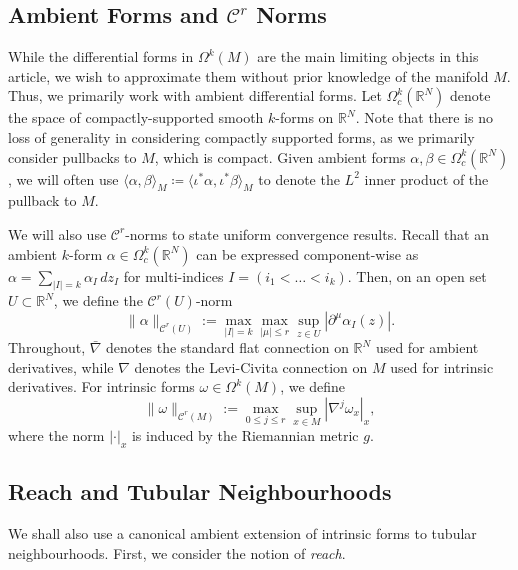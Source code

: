\documentclass[11pt,reqno]{amsproc}
\numberwithin{equation}{section}
\newcommand{\R}{\mathbb{R}}
\newcommand{\cC}{\mathcal{C}}
\theoremstyle{definition}
\theoremstyle{plain}
\begin{document}
    \subsection{Ambient Forms and $\cC^r$ Norms} \label{ssec:ambient_forms}
    While the differential forms in $\Omega^k(M)$ are the main limiting objects in this article, we wish to approximate them without prior knowledge of the manifold $M$. Thus, we primarily work with ambient differential forms. Let $\Omega^k_c(\R^N)$ denote the space of compactly-supported smooth $k$-forms on $\R^N$. Note that there is no loss of generality in considering compactly supported forms, as we primarily consider pullbacks to $M$, which is compact. Given ambient forms $\alpha, \beta \in \Omega^k_c(\R^N)$, we will often use $\langle \alpha, \beta \rangle_M \coloneqq \langle \iota^* \alpha, \iota^* \beta \rangle_M$
    to denote the $L^2$ inner product of the pullback to $M$. \medskip

    We will also use $\cC^r$-norms to state uniform convergence results. Recall that an ambient $k$-form $\alpha \in \Omega^k_c(\R^N)$ can be expressed component-wise as $\alpha = \sum_{|I|=k} \alpha_I \, dz_I$ for multi-indices $I = (i_1 < \ldots < i_k)$. Then, on an open set $U \subset \R^N$, we define the $\cC^r(U)$-norm
    \[
        \|\alpha\|_{\cC^r(U)}
        :=
        \max_{|I|=k}
        \max_{|\mu|\le r}
        \sup_{z\in U}
        |\partial^\mu \alpha_I(z)|.
    \]
    Throughout, $\bar\nabla$ denotes the standard flat connection on $\R^N$ used for ambient derivatives, while $\nabla$ denotes the Levi-Civita connection on $M$ used for intrinsic derivatives.
    For intrinsic forms $\omega \in \Omega^k(M)$, we define
    \[
        \|\omega\|_{\cC^r(M)}
        :=
        \max_{0\le j\le r}
        \sup_{x\in M}
        |\nabla^j \omega_x|_x,
    \]
    where the norm $|\cdot|_x$ is induced by the Riemannian metric $g$.
    \subsection{Reach and Tubular Neighbourhoods} \label{ssec:reach_tubular}

    We shall also use a canonical ambient extension of intrinsic forms to tubular neighbourhoods. First, we consider the notion of \emph{reach}.
\end{document}

